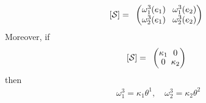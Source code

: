 \documentclass[10pt]{article}
\begin{document}
            \begin{proposition}
                \begin{equation*}
                    \begin{aligned}
                        [\mathcal{S}] = 
                        \normalsize{
                        \begin{array}{lc}
                            \setlength{\arraycolsep}{4pt}
                            \begingroup
                            \renewcommand*{\arraystretch}{1}
                            \begin{pmatrix}
                                \omega_1^3(e_1) & \omega_1^3(e_2) \\
                                \omega_2^3(e_1) & \omega_2^3(e_2) \\
                            \end{pmatrix}
                            \endgroup
                        \end{array}
                        }
                    \end{aligned}
                \end{equation*}
                Moreover, if
                \begin{equation*}
                    \begin{aligned}
                        [\mathcal{S}] = 
                        \begin{array}{lc}
                            \setlength{\arraycolsep}{2pt}
                            \begingroup
                            \renewcommand*{\arraystretch}{0.89}
                            \begin{pmatrix}
                                \kappa_1 & 0 \\
                                0 & \kappa_2 \\
                            \end{pmatrix}
                            \endgroup
                        \end{array}
                    \end{aligned}
                \end{equation*}
                then
                \begin{equation*}
                    \begin{aligned}
                        \omega_1^3 = \kappa_1\theta^1, \quad \omega_2^3 = \kappa_2\theta^2
                    \end{aligned}
                \end{equation*}
            \end{proposition}
\end{document}
